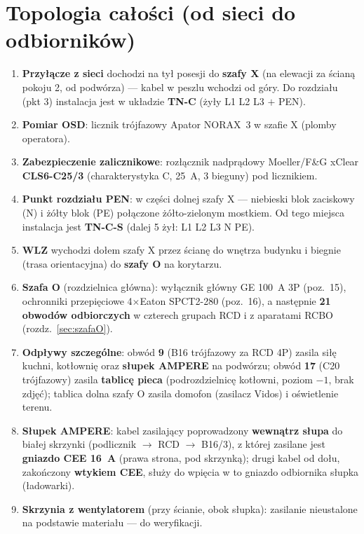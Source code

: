 \documentclass[11pt,a4paper]{article}
\begin{document}
\section{Topologia całości (od sieci do odbiorników)}
\begin{enumerate}
\item \textbf{Przyłącze z sieci} dochodzi na tył posesji do \textbf{szafy X} (na elewacji za ścianą
pokoju 2, od podwórza) --- kabel w peszlu wchodzi od góry. Do rozdziału (pkt 3) instalacja jest
w układzie \textbf{TN-C} (żyły L1 L2 L3 $+$ PEN).
\item \textbf{Pomiar OSD}: licznik trójfazowy Apator NORAX~3 w szafie X (plomby operatora).
\item \textbf{Zabezpieczenie zalicznikowe}: rozłącznik nadprądowy Moeller/F\&G xClear
\textbf{CLS6-C25/3} (charakterystyka C, 25~A, 3 bieguny) pod licznikiem.
\item \textbf{Punkt rozdziału PEN}: w części dolnej szafy X --- niebieski blok zaciskowy (N)
i żółty blok (PE) połączone żółto-zielonym mostkiem. Od tego miejsca instalacja jest
\textbf{TN-C-S} (dalej 5 żył: L1 L2 L3 N PE).
\item \textbf{WLZ} wychodzi dołem szafy X przez ścianę do wnętrza budynku i biegnie (trasa
orientacyjna) do \textbf{szafy O} na korytarzu.
\item \textbf{Szafa O} (rozdzielnica główna): wyłącznik główny GE 100~A 3P (poz.~15), ochronniki
przepięciowe 4$\times$Eaton SPCT2-280 (poz.~16), a następnie \textbf{21 obwodów odbiorczych}
w czterech grupach RCD i z aparatami RCBO (rozdz.~\ref{sec:szafaO}).
\item \textbf{Odpływy szczególne}: obwód \textbf{9} (B16 trójfazowy za RCD 4P) zasila siłę kuchni,
kotłownię oraz \textbf{słupek AMPERE} na podwórzu; obwód \textbf{17} (C20 trójfazowy) zasila
\textbf{tablicę pieca} (podrozdzielnicę kotłowni, poziom $-1$, brak zdjęć); tablica dolna szafy O
zasila domofon (zasilacz Vidos) i oświetlenie terenu.
\item \textbf{Słupek AMPERE}: kabel zasilający poprowadzony \textbf{wewnątrz słupa} do białej
skrzynki (podlicznik $\to$ RCD $\to$ B16/3), z której zasilane jest \textbf{gniazdo CEE 16~A}
(prawa strona, pod skrzynką); drugi kabel od dołu, zakończony \textbf{wtykiem CEE}, służy do
wpięcia w to gniazdo odbiornika słupka (ładowarki).
\item \textbf{Skrzynia z wentylatorem} (przy ścianie, obok słupka): zasilanie nieustalone
na podstawie materiału --- do weryfikacji.
\end{enumerate}
\end{document}
